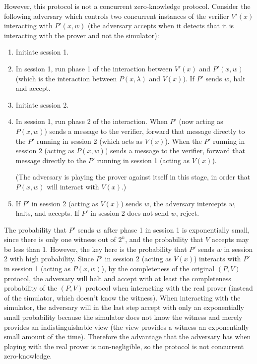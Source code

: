 \documentclass[draft]{article}
\begin{document}
\begin{enumerate}
  However, this protocol is not a concurrent zero-knowledge protocol.
  Consider the following adversary which controls two concurrent instances of the verifier $V'(x)$ interacting with $P'(x, w)$ (the adversary accepts when it detects that it is interacting with the prover and not the simulator):
  \begin{enumerate}
  \item Initiate session 1.
  \item
    In session 1, run phase 1 of the interaction between $V'(x)$ and $P'(x, w)$ (which is the interaction between $P(x, \lambda)$ and $V(x)$).
    If $P'$ sends $w$, halt and accept.
  \item Initiate session 2.
  \item 
    In session 1, run phase 2 of the interaction.
    When $P'$ (now acting as $P(x, w)$) sends a message to the verifier, forward that message directly to the $P'$ running in session 2 (which acts as $V(x)$).
    When the $P'$ running in session 2 (acting as $P(x, w)$) sends a message to the verifier, forward that message directly to the $P'$ running in session 1 (acting as $V(x)$).

    (The adversary is playing the prover against itself in this stage, in order that $P(x, w)$ will interact with $V(x)$.)
  \item
    If $P'$ in session 2 (acting as $V(x)$) sends $w$, the adversary intercepts $w$, halts, and accepts.
    If $P'$ in session 2 does not send $w$, reject.
  \end{enumerate}

  The probability that $P'$ sends $w$ after phase 1 in session 1 is exponentially small, since there is only one witness out of $2^n$, and the probability that $V$ accepts may be less than 1.
  However, the key here is the probability that $P'$ sends $w$ in session 2 with high probability.
  Since $P'$ in session 2 (acting as $V(x)$) interacts with $P'$ in session 1 (acting as $P(x, w)$), by the completeness of the original $(P, V)$ protocol, the adversary will halt and accept with at least the completeness probability of the $(P, V)$ protocol when interacting with the real prover (instead of the simulator, which doesn't know the witness).
  When interacting with the simulator, the adversary will in the last step accept with only an exponentially small probability because the simulator does not know the witness and merely provides an indistinguishable view (the view provides a witness an exponentially small amount of the time).
  Therefore the advantage that the adversary has when playing with the real prover is non-negligible, so the protocol is not concurrent zero-knowledge.
\end{enumerate}
\end{document}

